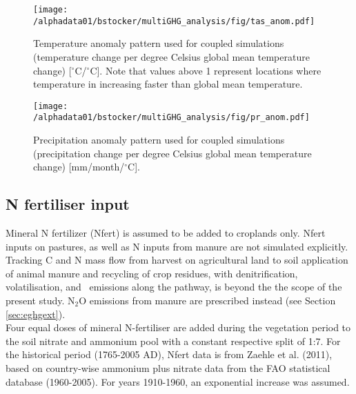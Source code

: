 \documentclass{myreport}
\begin{document}
\begin{figure}[ht!]
\texttt{[image: /alphadata01/bstocker/multiGHG\_analysis/fig/tas\_anom.pdf]}
\caption{Temperature anomaly pattern used for coupled simulations (temperature change per degree Celsius global mean temperature change) [$^\circ$C/$^\circ$C]. Note that values above 1 represent locations where temperature in increasing faster than global mean temperature.}
\label{fig:tas_anom}
\end{figure}

\begin{figure}[ht!]
\texttt{[image: /alphadata01/bstocker/multiGHG\_analysis/fig/pr\_anom.pdf]}
\caption{Precipitation anomaly pattern used for coupled simulations (precipitation change per degree Celsius global mean temperature change) [mm/month/$^\circ$C].}
\label{fig:pr_anom}
\end{figure}

\clearpage

\subsection{N fertiliser input}
\label{sec:nfert}

Mineral N fertilizer (Nfert) is assumed to be added to croplands only. Nfert inputs on pastures, as well as N inputs from manure are not simulated explicitly. Tracking C and N mass flow from harvest on agricultural land to soil application of animal manure and recycling of crop residues, with denitrification, volatilisation, and \nno\ emissions along the pathway, is beyond the the scope of the present study. N$_2$O emissions from manure are prescribed instead (see Section \ref{sec:eghgext}).\\

Four equal doses of mineral N-fertiliser are added during the vegetation period to the soil nitrate and ammonium pool with a constant respective split of 1:7. For the historical period (1765-2005 AD), Nfert data is from Zaehle et al. (2011)\cite{zaehle11ngeo}, based on country-wise ammonium plus nitrate data from the FAO statistical database (1960-2005)\cite{fao}. For years 1910-1960, an exponential increase was assumed.\\
\end{document}
